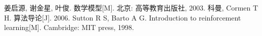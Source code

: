 \documentclass[withoutpre]{cumcmthesis} %
\begin{document}
\begin{thebibliography}{9}%
     姜启源, 谢金星, 叶俊. 数学模型[M]. 北京: 高等教育出版社, 2003.
     科曼, Cormen T H. 算法导论[J]. 2006.
     Sutton R S, Barto A G. Introduction to reinforcement learning[M]. Cambridge: MIT press, 1998.

\end{thebibliography}
\end{document}
